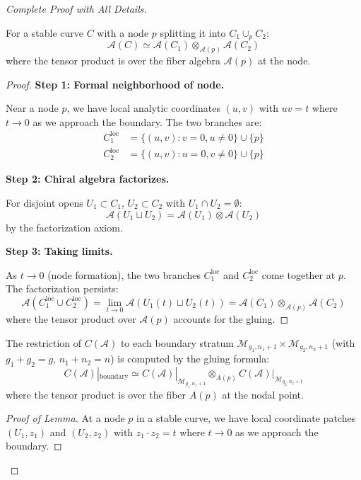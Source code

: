 \begin{proof}[Complete Proof with All Details]
\begin{proposition}\label{prop:gluing-at-nodes}
For a stable curve $C$ with a node $p$ splitting it into $C_1 \cup_p C_2$:
$$\mathcal{A}(C) \simeq \mathcal{A}(C_1) \otimes_{\mathcal{A}(p)} \mathcal{A}(C_2)$$
where the tensor product is over the fiber algebra $\mathcal{A}(p)$ at the node.
\end{proposition}

\begin{proof}
\textbf{Step 1: Formal neighborhood of node.}

Near a node $p$, we have local analytic coordinates $(u,v)$ with $uv = t$ where $t \to 0$ as we approach the boundary. The two branches are:
\begin{align*}
C_1^{\text{loc}} &= \{(u, v) : v = 0, u \neq 0\} \cup \{p\} \\
C_2^{\text{loc}} &= \{(u, v) : u = 0, v \neq 0\} \cup \{p\}
\end{align*}

\textbf{Step 2: Chiral algebra factorizes.}

For disjoint opens $U_1 \subset C_1$, $U_2 \subset C_2$ with $U_1 \cap U_2 = \emptyset$:
$$\mathcal{A}(U_1 \sqcup U_2) = \mathcal{A}(U_1) \otimes \mathcal{A}(U_2)$$
by the factorization axiom.

\textbf{Step 3: Taking limits.}

As $t \to 0$ (node formation), the two branches $C_1^{\text{loc}}$ and $C_2^{\text{loc}}$ come together at $p$. The factorization persists:
$$\mathcal{A}(C_1^{\text{loc}} \cup C_2^{\text{loc}}) = \lim_{t \to 0} \mathcal{A}(U_1(t) \sqcup U_2(t)) = \mathcal{A}(C_1) \otimes_{\mathcal{A}(p)} \mathcal{A}(C_2)$$
where the tensor product over $\mathcal{A}(p)$ accounts for the gluing. \qedhere
\end{proof}

\begin{lemma}\label{lem:boundary-compatible}
The restriction of $C(\mathcal{A})$ to each boundary stratum 
$\mathcal{M}_{g_1,n_1+1} \times \mathcal{M}_{g_2,n_2+1}$ (with $g_1+g_2=g$, $n_1+n_2=n$) 
is computed by the gluing formula:
$$C(\mathcal{A})|_{\text{boundary}} \simeq C(\mathcal{A})|_{\mathcal{M}_{g_1,n_1+1}} 
\otimes_{A(p)} C(\mathcal{A})|_{\mathcal{M}_{g_2,n_2+1}}$$
where the tensor product is over the fiber $A(p)$ at the nodal point.
\end{lemma}

\begin{proof}[Proof of Lemma]
At a node $p$ in a stable curve, we have local coordinate patches $(U_1, z_1)$ and 
$(U_2, z_2)$ with $z_1 \cdot z_2 = t$ where $t \to 0$ as we approach the boundary.


\end{proof}
\end{proof}
